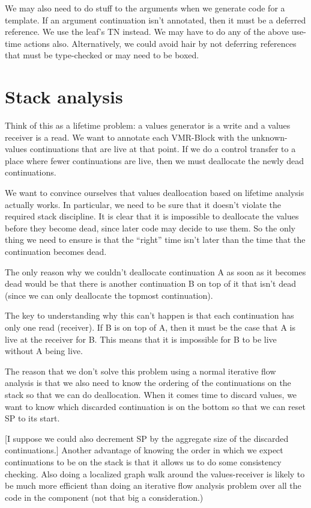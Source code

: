 We may also need to do stuff to the arguments when we generate code for a
template.  If an argument continuation isn't annotated, then it must be a
deferred reference.  We use the leaf's TN instead.  We may have to do any of
the above use-time actions also.  Alternatively, we could avoid hair by not
deferring references that must be type-checked or may need to be boxed.


\section{Stack analysis}

Think of this as a lifetime problem: a values generator is a write and a values
receiver is a read.  We want to annotate each VMR-Block with the unknown-values
continuations that are live at that point.  If we do a control transfer to a
place where fewer continuations are live, then we must deallocate the newly
dead continuations.

We want to convince ourselves that values deallocation based on lifetime
analysis actually works.  In particular, we need to be sure that it doesn't
violate the required stack discipline.  It is clear that it is impossible to
deallocate the values before they become dead, since later code may decide to
use them.  So the only thing we need to ensure is that the ``right'' time isn't
later than the time that the continuation becomes dead.

The only reason why we couldn't deallocate continuation A as soon as it becomes
dead would be that there is another continuation B on top of it that isn't dead
(since we can only deallocate the topmost continuation).

The key to understanding why this can't happen is that each continuation has
only one read (receiver).  If B is on top of A, then it must be the case that A
is live at the receiver for B.  This means that it is impossible for B to be
live without A being live.


The reason that we don't solve this problem using a normal iterative flow
analysis is that we also need to know the ordering of the continuations on the
stack so that we can do deallocation.  When it comes time to discard values, we
want to know which discarded continuation is on the bottom so that we can reset
SP to its start.  

[I suppose we could also decrement SP by the aggregate size of the discarded
continuations.]  Another advantage of knowing the order in which we expect
continuations to be on the stack is that it allows us to do some consistency
checking.  Also doing a localized graph walk around the values-receiver is
likely to be much more efficient than doing an iterative flow analysis problem
over all the code in the component (not that big a consideration.)



